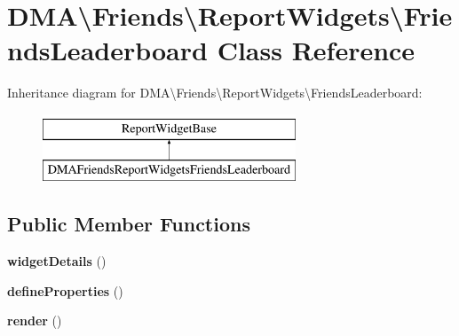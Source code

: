 \hypertarget{classDMA_1_1Friends_1_1ReportWidgets_1_1FriendsLeaderboard}{\section{D\+M\+A\textbackslash{}Friends\textbackslash{}Report\+Widgets\textbackslash{}Friends\+Leaderboard Class Reference}
\label{classDMA_1_1Friends_1_1ReportWidgets_1_1FriendsLeaderboard}
}
Inheritance diagram for D\+M\+A\textbackslash{}Friends\textbackslash{}Report\+Widgets\textbackslash{}Friends\+Leaderboard\+:\begin{figure}[H]
\begin{center}
\leavevmode
\includegraphics[height=2.000000cm]{dd/dbd/classDMA_1_1Friends_1_1ReportWidgets_1_1FriendsLeaderboard}
\end{center}
\end{figure}
\subsection*{Public Member Functions}
\begin{DoxyCompactItemize}
\item 
\hypertarget{classDMA_1_1Friends_1_1ReportWidgets_1_1FriendsLeaderboard_ac5fc1d8631aca255dee64a37ddeed5f6}{{\bfseries widget\+Details} ()}\label{classDMA_1_1Friends_1_1ReportWidgets_1_1FriendsLeaderboard_ac5fc1d8631aca255dee64a37ddeed5f6}

\item 
\hypertarget{classDMA_1_1Friends_1_1ReportWidgets_1_1FriendsLeaderboard_a8a2b873a91fc33c558834423e35da4bc}{{\bfseries define\+Properties} ()}\label{classDMA_1_1Friends_1_1ReportWidgets_1_1FriendsLeaderboard_a8a2b873a91fc33c558834423e35da4bc}

\item 
\hypertarget{classDMA_1_1Friends_1_1ReportWidgets_1_1FriendsLeaderboard_acc5889523847a95eb855e6041c5ef92f}{{\bfseries render} ()}\label{classDMA_1_1Friends_1_1ReportWidgets_1_1FriendsLeaderboard_acc5889523847a95eb855e6041c5ef92f}

\end{DoxyCompactItemize}

